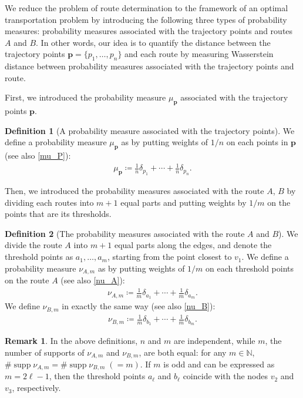 \documentclass{article}
\numberwithin{equation}{section}
\theoremstyle{definition}
\newtheorem{definition}{Definition}[section]
\newtheorem{remark}[remark]{Remark}
\newcommand{\de}{\delta}
\newcommand{\N}{\mathbb{N}}
\DeclareMathOperator\supp{supp} %
\def\:={\coloneqq} %
\begin{document}
We reduce the problem of route determination to the framework of an optimal transportation problem by introducing the following three types of probability measures: probability measures associated with the trajectory points and routes $A$ and $B$.
In other words, our idea is to quantify the distance between the trajectory points $\mathbf{p}=\{p_1,\ldots,p_n\}$ and each route by measuring Wasserstein distance between probability measures associated with the trajectory points and route.

First, we introduced the probability measure $\mu_\mathbf{p}$ associated with the trajectory points $\mathbf{p}$.

\begin{definition}[A probability measure associated with the trajectory points]
We define a probability measure $\mu_\mathbf{p}$ as by putting weights of $1/n$ on each points in $\mathbf{p}$ (see also \autoref{mu_P}):
\begin{align*}
    \mu_\mathbf{p} \:= \frac{1}{n}\de_{p_1}+\cdots+\frac{1}{n}\de_{p_n}. 
\end{align*}
\end{definition}

Then, we introduced the probability measures associated with the route $A$, $B$ by dividing each routes into $m+1$ equal parts and putting weights by $1/m$ on the points that are its thresholds. 

\begin{definition}[The probability measures associated with the route $A$ and $B$]
We divide the route $A$ into $m+1$ equal parts along the edges, and denote the threshold points as $a_1,\ldots,a_m$, starting from the point closest to $v_1$.
We define a probability measure $\nu_{A,m}$ as by putting weights of $1/m$ on each threshold points on the route $A$ (see also \autoref{nu_A}):
\begin{align*}
    \nu_{A,m} \:= \frac{1}{m}\de_{a_1}+\cdots+\frac{1}{m}\de_{a_m}. 
\end{align*}
We define $\nu_{B,m}$ in exactly the same way (see also \autoref{nu_B}):
\begin{align*}
    \nu_{B,m} \:= \frac{1}{m}\de_{b_1}+\cdots+\frac{1}{m}\de_{b_m}.
\end{align*}
\end{definition}

\begin{remark}
In the above definitions, $n$ and $m$ are independent, while $m$, the number of supports of $\nu_{A,m}$ and $\nu_{B,m}$, are both equal: 
for any $m\in\N$, $\#\supp\nu_{A,m}=\#\supp\nu_{B,m}\;(=m)$.
If $m$ is odd and can be expressed as $m=2\ell-1$, then the threshold points $a_\ell$ and $b_\ell$ coincide with the nodes $v_2$ and $v_3$, respectively.
\end{remark}
\end{document}
